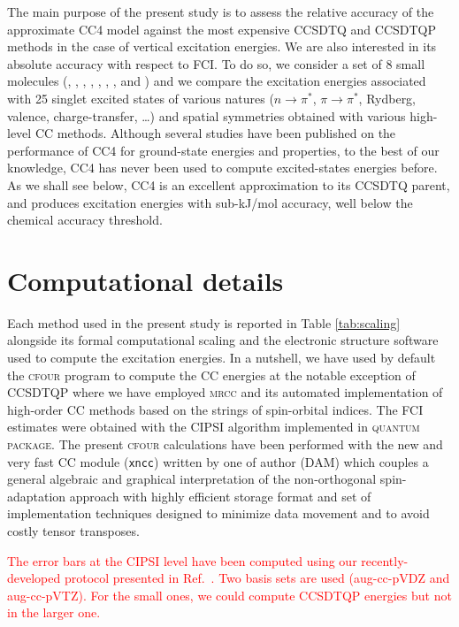 \documentclass[aip,jcp,reprint,noshowkeys,superscriptaddress]{revtex4-1}
\newcommand{\titou}[1]{\textcolor{red}{#1}}
\newcommand{\QP}{\textsc{quantum package}}
\newcommand{\MRCC}{\textsc{mrcc}}
\newcommand{\CFOUR}{\textsc{cfour}}
\newcommand{\npis}{n \to \pi^*}
\newcommand{\pipis}{\pi \to \pi^*}
\begin{document}
The main purpose of the present study is to assess the relative accuracy of the approximate CC4 model against the most expensive CCSDTQ and CCSDTQP methods in the case of vertical excitation energies.
We are also interested in its absolute accuracy with respect to FCI.
To do so, we consider a set of 8 small molecules (, , , , , , , and ) and we compare the excitation energies associated with 25 singlet excited states of various natures ($\npis$, $\pipis$, Rydberg, valence, charge-transfer, \ldots) and spatial symmetries obtained with various high-level CC methods.
Although several studies have been published on the performance of CC4 for ground-state energies and properties, to the best of our knowledge, CC4 has never been used to compute excited-states energies before.
As we shall see below, CC4 is an excellent approximation to its CCSDTQ parent, and produces excitation energies with sub-kJ/mol accuracy, well below the chemical accuracy threshold.

\section{Computational details}

Each method used in the present study is reported in Table \ref{tab:scaling} alongside its formal computational scaling and the electronic structure software used to compute the excitation energies.
In a nutshell, we have used by default the {\CFOUR} program to compute the CC energies at the notable exception of CCSDTQP where we have employed {\MRCC} and its automated implementation of high-order CC methods based on the strings of spin-orbital indices.
The FCI estimates were obtained with the CIPSI algorithm implemented in {\QP}.
The present {\CFOUR} calculations have been performed with the new and very fast CC module (\texttt{xncc}) written by one of author (DAM) which couples a general algebraic
and graphical interpretation of the non-orthogonal spin-adaptation approach with highly efficient storage format and set of implementation techniques designed to minimize data movement and to avoid costly tensor transposes.

\titou{The error bars at the CIPSI level have been computed using our recently-developed protocol presented in Ref.~\onlinecite{Veril_2021}.
Two basis sets are used (aug-cc-pVDZ and aug-cc-pVTZ). 
For the small ones, we could compute CCSDTQP energies but not in the larger one.}
\end{document}
